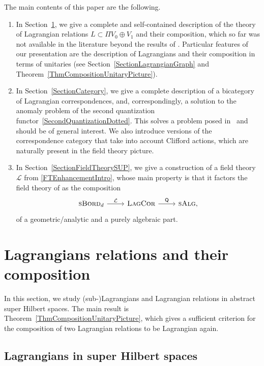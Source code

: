 \documentclass[pdftex]{sigma}
\numberwithin{equation}{section}
\newcommand{\LagCor}{\textsc{LagCor}}
\newcommand{\sBord}{\textsc{sBord}}
\begin{document}
The main contents of this paper are the following.
\begin{enumerate}\itemsep=0pt
\item[(1)]
In Section~\ref{SectionRelations}, we give a complete and self-contained description of the theory of Lagrangian relations $L \subset \Pi V_0 \oplus V_1$ and their composition, which so far was not available in the literature beyond the results of \cite[Section~2]{LudewigRoos}.
Particular features of our presentation are the description of Lagrangians and their composition in terms of unitaries (see Section~\ref{SectionLagrangianGraph} and Theorem~\ref{ThmCompositionUnitaryPicture}).
\item[(2)]
In Section~\ref{SectionCategory}, we give a complete description of a bicategory of Lagrangian correspondences, and, correspondingly, a solution to the anomaly problem of the second quantization functor~\eqref{SecondQuantizationDotted}.
This solves a problem posed in~\cite{LudewigRoos} and should be of general interest.
We also introduce versions of the correspondence category that take into account Clifford actions, which are naturally present in the field theory picture.
\item[(3)]
In Section~\ref{SectionFieldTheorySUP}, we give a construction of a field theory $\mathcal{L}$ from \eqref{FTEnhancementIntro}, whose main property is that it factors the field theory of \cite{LudewigRoos} as the composition
\begin{equation*}
 \begin{tikzcd}
 \sBord_d \ar[r, "\mathcal{L}"] & \LagCor \ar[r, "\textsf{Q}"] & \textsc{sAlg},
\end{tikzcd}
\end{equation*}
of a geometric/analytic and a purely algebraic part.
\end{enumerate}

\section{Lagrangians relations and their composition}\label{SectionRelations}

In this section, we study (sub-)Lagrangians and Lagrangian relations in abstract super Hilbert spaces.
The main result is Theorem~\ref{ThmCompositionUnitaryPicture}, which gives a sufficient criterion for the composition of two Lagrangian relations to be Lagrangian again.

\subsection{Lagrangians in super Hilbert spaces}
\end{document}

